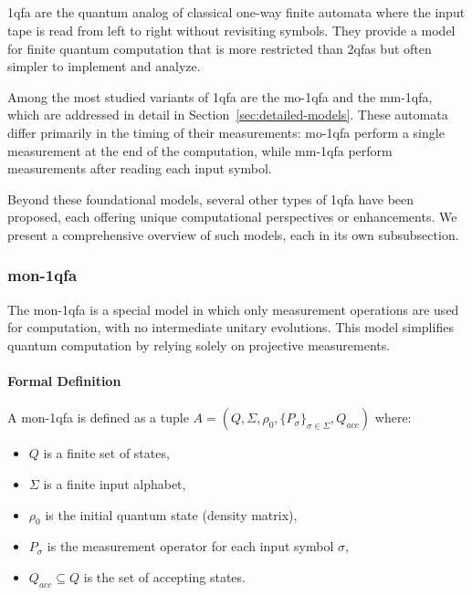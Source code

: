 \subsection{}
\label{sec:1-way-qfa}

\gls{1qfa} are the quantum analog of classical one-way finite automata where the input tape is read from left to right without revisiting symbols. They provide a model for finite quantum computation that is more restricted than \glspl{2qfa} but often simpler to implement and analyze.

Among the most studied variants of \gls{1qfa} are the \gls{mo-1qfa} and the \gls{mm-1qfa}, which are addressed in detail in Section~\ref{sec:detailed-models}. These automata differ primarily in the timing of their measurements: \gls{mo-1qfa} perform a single measurement at the end of the computation, while \gls{mm-1qfa} perform measurements after reading each input symbol.

Beyond these foundational models, several other types of \gls{1qfa} have been proposed, each offering unique computational perspectives or enhancements. We present a comprehensive overview of such models, each in its own subsubsection.

\subsubsection{\gls{mon-1qfa}}
The \gls{mon-1qfa} is a special model in which only measurement operations are used for computation, with no intermediate unitary evolutions. This model simplifies quantum computation by relying solely on projective measurements.

\paragraph{Formal Definition}
A \gls{mon-1qfa} is defined as a tuple \( A = (Q, \Sigma, \rho_0, \{P_{\sigma}\}_{\sigma \in \Sigma}, Q_{acc}) \) where:
\begin{itemize}
    \item \( Q \) is a finite set of states,
    \item \( \Sigma \) is a finite input alphabet,
    \item \( \rho_0 \) is the initial quantum state (density matrix),
    \item \( P_{\sigma} \) is the measurement operator for each input symbol \( \sigma \),
    \item \( Q_{acc} \subseteq Q \) is the set of accepting states.
\end{itemize}

